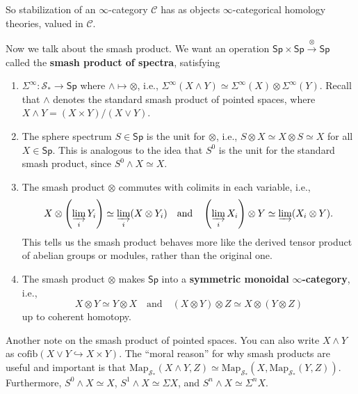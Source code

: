 So stabilization of an $\infty$-category $\mathcal{C} $ has as objects $\infty$-categorical homology theories, valued in $\mathcal{C} $. 
\orbreak

Now we talk about the smash product. We want an operation $\mathsf{Sp}\times \mathsf{Sp} \overset{\otimes}{\longrightarrow} \mathsf{Sp}   $ called the \textbf{smash product of spectra}, satisfying
\begin{enumerate}[label=(\roman*)]
\setlength\itemsep{-.2em}
    \item $\Sigma ^{\infty} \colon \mathcal{S} _* \to \mathsf{Sp} $ where $\wedge  \mapsto \otimes$, i.e., $\Sigma ^{\infty}(X \wedge Y) \simeq  \Sigma ^{\infty}(X) \otimes \Sigma ^{\infty}(Y)$. Recall that $\wedge $ denotes the standard smash product of pointed spaces, where $X \wedge Y=(X \times Y) / (X \vee Y)$.
    \item The sphere spectrum $S \in \mathsf{Sp} $ is the unit for $\otimes$, i.e., $S \otimes X \simeq  X \otimes S \simeq  X$ for all $X \in \mathsf{Sp} $. This is analogous to the idea that $S^0$ is the unit for the standard smash product, since $S^0 \wedge X\simeq  X$.
    \item The smash product $\otimes $ commutes with colimits in each variable, i.e., \[
            X\otimes \left( \varinjlim _i  Y_i  \right) \simeq \varinjlim_i  (X \otimes Y_i ) \quad \text{and}  \quad \left( \varinjlim _i X_i  \right) \otimes Y \simeq  \varinjlim (X_i  \otimes Y).
    \] This tells us the smash product behaves more like the derived tensor product of abelian groups or modules, rather than the original one.
\item The smash product $\otimes $ makes $\mathsf{Sp} $ into a \textbf{symmetric monoidal} $\mathbf \infty$\textbf{-category}, i.e., \[
        X\otimes Y \simeq  Y\otimes X\quad \text{and} \quad(X\otimes Y)\otimes Z \simeq X\otimes (Y\otimes Z)
\] up to coherent homotopy.
\end{enumerate}
Another note on the smash product of pointed spaces. You can also write $X \wedge Y$ as $\mathrm{cofib}(X \vee Y \hookrightarrow X\times Y)$. The ``moral reason'' for why smash products are useful and important is that $\mathrm{Map}_{\mathcal{S} _*}(X \wedge Y,Z) \simeq  \mathrm{Map}_{\mathcal{S} _*}(X, \mathrm{Map}_{\mathcal{S} _*}(Y,Z))$. Furthermore, $S^0 \wedge X \simeq X$, $S^1 \wedge X \simeq \Sigma X$, and $S^n \wedge X\simeq \Sigma^n X$.

